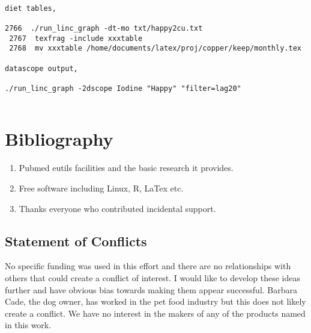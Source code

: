 \begin{lstlisting}

diet tables, 

2766  ./run_linc_graph -dt-mo txt/happy2cu.txt 
 2767  texfrag -include xxxtable 
 2768  mv xxxtable /home/documents/latex/proj/copper/keep/monthly.tex

datascope output, 

./run_linc_graph -2dscope Iodine "Happy" "filter=lag20"


\end{lstlisting}
\section{Bibliography}






\begin{acknowledgments} 

% 
\begin{enumerate}
\item Pubmed eutils facilities and the basic research it provides. 
\item Free software including Linux, R, LaTex  etc.
\item Thanks everyone who contributed incidental support. 
\end{enumerate}

\end{acknowledgments}

\clearpage
\appendix

\begin{mdpicomment}

\section{ Statement of Conflicts }
 No specific funding was used in this effort and there are no relationships
with others that could create a conflict of interest. I would like to develop
these ideas further and have obvious bias towards making them appear 
successful. Barbara Cade, the dog owner, has worked in the pet food industry
but this does not likely create a conflict. We have no interest in the
makers of any of the products named in this work.  

\end{mdpicomment}

